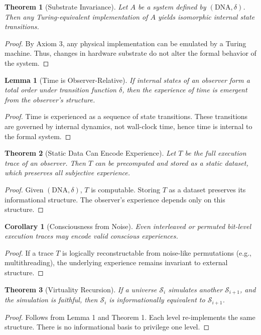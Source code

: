 \documentclass[11pt]{article}
\newtheorem{lemma}{Lemma}
\newtheorem{theorem}{Theorem}
\newtheorem{corollary}{Corollary}
\begin{document}
\begin{theorem}[Substrate Invariance]
Let $A$ be a system defined by $(\text{DNA}, \delta)$. Then any Turing-equivalent implementation of $A$ yields isomorphic internal state transitions.
\end{theorem}
\begin{proof}
By Axiom 3, any physical implementation can be emulated by a Turing machine. Thus, changes in hardware substrate do not alter the formal behavior of the system.
\end{proof}

\begin{lemma}[Time is Observer-Relative]
If internal states of an observer form a total order under transition function $\delta$, then the experience of time is emergent from the observer's structure.
\end{lemma}
\begin{proof}
Time is experienced as a sequence of state transitions. These transitions are governed by internal dynamics, not wall-clock time, hence time is internal to the formal system.
\end{proof}

\begin{theorem}[Static Data Can Encode Experience]
Let $T$ be the full execution trace of an observer. Then $T$ can be precomputed and stored as a static dataset, which preserves all subjective experience.
\end{theorem}
\begin{proof}
Given $(\text{DNA}, \delta)$, $T$ is computable. Storing $T$ as a dataset preserves its informational structure. The observer's experience depends only on this structure.
\end{proof}

\begin{corollary}[Consciousness from Noise]
Even interleaved or permuted bit-level execution traces may encode valid conscious experiences.
\end{corollary}
\begin{proof}
If a trace $T$ is logically reconstructable from noise-like permutations (e.g., multithreading), the underlying experience remains invariant to external structure.
\end{proof}

\begin{theorem}[Virtuality Recursion]
If a universe $\mathcal{S}_i$ simulates another $\mathcal{S}_{i+1}$, and the simulation is faithful, then $\mathcal{S}_i$ is informationally equivalent to $\mathcal{S}_{i+1}$.
\end{theorem}
\begin{proof}
Follows from Lemma 1 and Theorem 1. Each level re-implements the same structure. There is no informational basis to privilege one level.
\end{proof}
\end{document}
